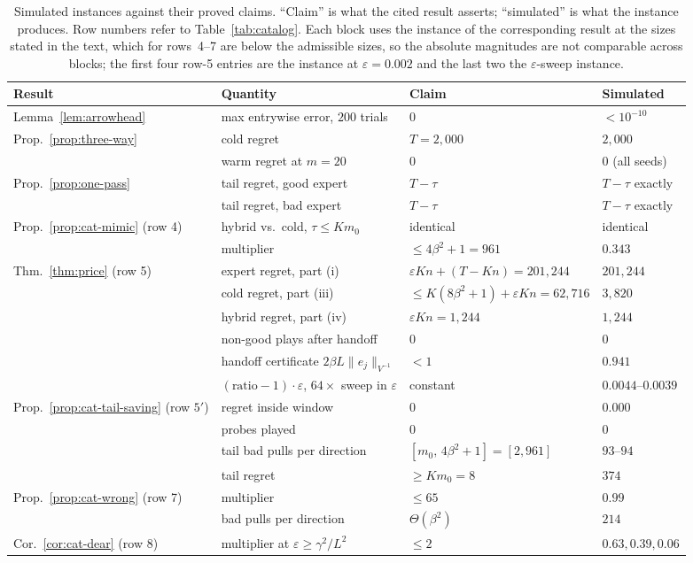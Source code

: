 \documentclass[anon]{alt2027} %
\newcommand{\eps}{\varepsilon}
\begin{document}
\begin{table}[h]
\centering
\caption{Simulated instances against their proved claims. ``Claim'' is what
the cited result asserts; ``simulated'' is what the instance produces. Row
numbers refer to Table~\ref{tab:catalog}. Each block uses the instance of the
corresponding result at the sizes stated in the text, which for rows~4--7 are
below the admissible sizes, so the absolute magnitudes are
not comparable across blocks; the first four row-5 entries are the instance at
$\eps=0.002$ and the last two the $\eps$-sweep instance.}
\label{tab:synthetic}
\small
\setlength{\tabcolsep}{4pt}
\begin{tabular}{@{}llll@{}}
\toprule
Result & Quantity & Claim & Simulated \\
\midrule
Lemma~\ref{lem:arrowhead} & max entrywise error, $200$ trials & $0$ & $<10^{-10}$ \\
\midrule
Prop.~\ref{prop:three-way} & cold regret & $T=2{,}000$ & $2{,}000$ \\
 & warm regret at $m=20$ & $0$ & $0$ (all seeds) \\
Prop.~\ref{prop:one-pass} & tail regret, good expert & $T-\tau$ & $T-\tau$ exactly \\
 & tail regret, bad expert & $T-\tau$ & $T-\tau$ exactly \\
\midrule
Prop.~\ref{prop:cat-mimic} (row 4) & hybrid vs.\ cold, $\tau\le Km_0$ & identical & identical \\
 & multiplier & $\le4\beta^2+1=961$ & $0.343$ \\
\midrule
Thm.~\ref{thm:price} (row 5) & expert regret, part (i) & $\eps Kn+(T{-}Kn)=201{,}244$ & $201{,}244$ \\
 & cold regret, part (iii) & $\le K(8\beta^2{+}1)+\eps Kn=62{,}716$ & $3{,}820$ \\
 & hybrid regret, part (iv) & $\eps Kn=1{,}244$ & $1{,}244$ \\
 & non-good plays after handoff & $0$ & $0$ \\
 & handoff certificate $2\beta L\|e_j\|_{V^{-1}}$ & $<1$ & $0.941$ \\
 & $(\text{ratio}-1)\cdot\eps$, $64\times$ sweep in $\eps$ & constant & $0.0044$--$0.0039$ \\
\midrule
Prop.~\ref{prop:cat-tail-saving} (row $5'$) & regret inside window & $0$ & $0.000$ \\
 & probes played & $0$ & $0$ \\
 & tail bad pulls per direction & $[m_0,\,4\beta^2{+}1]=[2,961]$ & $93$--$94$ \\
 & tail regret & $\ge Km_0=8$ & $374$ \\
\midrule
Prop.~\ref{prop:cat-wrong} (row 7) & multiplier & $\le65$ & $0.99$ \\
 & bad pulls per direction & $\Theta(\beta^2)$ & $214$ \\
\midrule
Cor.~\ref{cor:cat-dear} (row 8) & multiplier at $\eps\ge \gamma^2/L^2$ & $\le2$ & $0.63,0.39,0.06$ \\
\bottomrule
\end{tabular}
\end{table}
\end{document}
